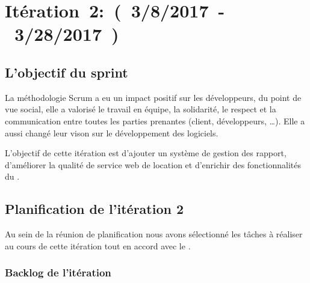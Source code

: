 \section{Itération~2:~(~3/8/2017~-~3/28/2017~)}

\subsection{L'objectif du sprint}

La méthodologie Scrum a eu un impact positif sur les développeurs, du point de
vue social, elle a valorisé le travail en équipe, la solidarité, le respect et
la communication entre toutes les parties prenantes (client, développeurs,
\ldots). Elle a aussi changé leur vison sur le développement des logiciels.

L'objectif de cette itération est d'ajouter un système de gestion des rapport,
d'améliorer la qualité de service web de location et d'enrichir des
fonctionnalités du .

\subsection{Planification de l'itération 2}

Au sein de la réunion de planification nous avons sélectionné les tâches à
réaliser au cours de cette itération tout en accord avec le .

\subsubsection{Backlog de l'itération}

